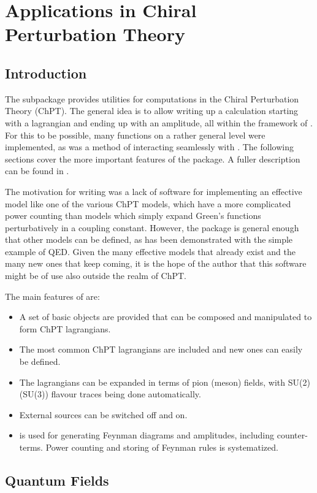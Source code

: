 \section{Applications in Chiral Perturbation Theory}

\subsection{Introduction}

The subpackage \fphi provides utilities for computations in the Chiral Perturbation Theory (ChPT). The general idea is to allow writing up a calculation starting with a lagrangian and ending up with an amplitude, all within the framework of \fc. For this to be possible, many functions on a rather general level were implemented, as was a method of interacting seamlessly with \fa. The following sections cover the more important features of the package. A fuller description can be found in \cite{PHI}.

The motivation for writing \fphi was a lack of software for implementing an effective model like one of the various ChPT models, which have a more complicated power counting than models which simply expand Green's functions perturbatively in a coupling constant. However, the package is general enough that other models can be defined, as has been demonstrated with the simple example of QED. Given the many effective models that already exist and the many new ones that keep coming, it is the hope of the author that this software might be of use also outside the realm of ChPT.

The main features of \fphi are:
\begin{itemize}
\item A set of basic objects are provided that can be composed and manipulated to form ChPT lagrangians.
\item The most common ChPT lagrangians are included and new ones can easily be defined.
\item The lagrangians can be expanded in terms of pion (meson) fields, with SU(2) (SU(3)) flavour traces being done automatically.
\item External sources can be switched off and on.
\item \fa is used for generating Feynman diagrams and amplitudes, including counter-terms. Power counting and storing of Feynman rules is systematized.
\end{itemize}

\subsection{Quantum Fields}

